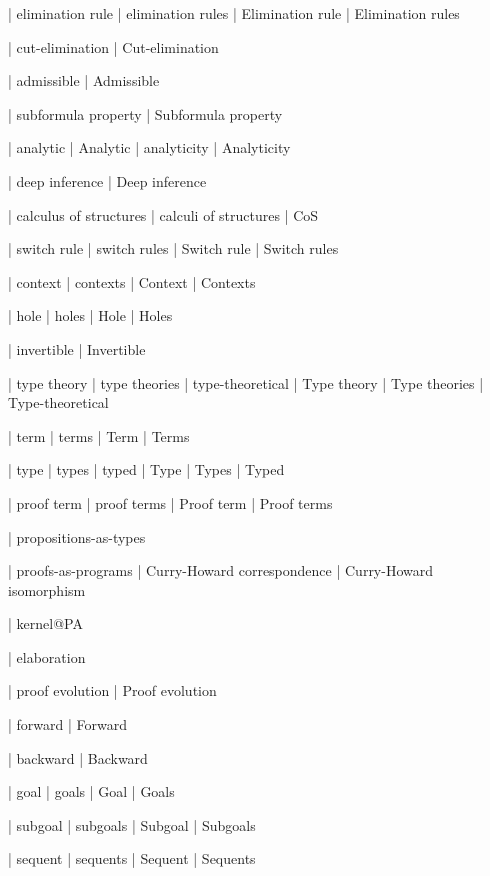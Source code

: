  | elimination rule
 | elimination rules
 | Elimination rule
 | Elimination rules

 | cut-elimination
 | Cut-elimination

 | admissible
 | Admissible

 | subformula property
 | Subformula property

 | analytic
 | Analytic
 | analyticity
 | Analyticity

 | deep inference
 | Deep inference

 | calculus of structures
 | calculi of structures
 | CoS
 
 | switch rule
 | switch rules
 | Switch rule
 | Switch rules
 
 | context
 | contexts
 | Context
 | Contexts

 | hole
 | holes
 | Hole
 | Holes

 | invertible
 | Invertible

 | type theory
 | type theories
 | type-theoretical
 | Type theory
 | Type theories
 | Type-theoretical

 | term
 | terms
 | Term
 | Terms

 | type
 | types
 | typed
 | Type
 | Types
 | Typed

 | proof term
 | proof terms
 | Proof term
 | Proof terms

 | propositions-as-types

 | proofs-as-programs
 | Curry-Howard correspondence
 | Curry-Howard isomorphism

 | kernel@PA

 | elaboration

 | proof evolution
 | Proof evolution

 | forward
 | Forward

 | backward
 | Backward
 
 | goal
 | goals
 | Goal
 | Goals

 | subgoal
 | subgoals
 | Subgoal
 | Subgoals

 | sequent
 | sequents
 | Sequent
 | Sequents

